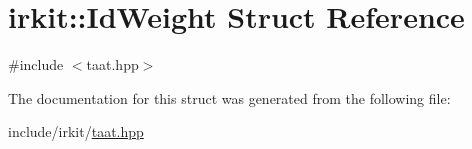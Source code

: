 \hypertarget{structirkit_1_1IdWeight}{}\section{irkit\+:\+:Id\+Weight Struct Reference}
\label{structirkit_1_1IdWeight}


{\ttfamily \#include $<$taat.\+hpp$>$}



The documentation for this struct was generated from the following file\+:\begin{DoxyCompactItemize}
\item 
include/irkit/\hyperlink{taat_8hpp}{taat.\+hpp}\end{DoxyCompactItemize}
